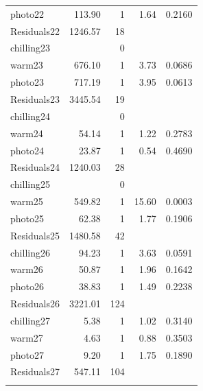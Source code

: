 \documentclass{article}\usepackage[]{graphicx}\usepackage[]{color}
\begin{document}
\begin{table}[ht]
\begin{tabular}{lrrrr}
  photo22 & 113.90 & 1 & 1.64 & 0.2160 \\ 
  Residuals22 & 1246.57 & 18 &  &  \\ 
   \hline
chilling23 &  & 0 &  &  \\ 
  warm23 & 676.10 & 1 & 3.73 & 0.0686 \\ 
  photo23 & 717.19 & 1 & 3.95 & 0.0613 \\ 
  Residuals23 & 3445.54 & 19 &  &  \\ 
   \hline
chilling24 &  & 0 &  &  \\ 
  warm24 & 54.14 & 1 & 1.22 & 0.2783 \\ 
  photo24 & 23.87 & 1 & 0.54 & 0.4690 \\ 
  Residuals24 & 1240.03 & 28 &  &  \\ 
   \hline
chilling25 &  & 0 &  &  \\ 
  warm25 & 549.82 & 1 & 15.60 & 0.0003 \\ 
  photo25 & 62.38 & 1 & 1.77 & 0.1906 \\ 
  Residuals25 & 1480.58 & 42 &  &  \\ 
   \hline
chilling26 & 94.23 & 1 & 3.63 & 0.0591 \\ 
  warm26 & 50.87 & 1 & 1.96 & 0.1642 \\ 
  photo26 & 38.83 & 1 & 1.49 & 0.2238 \\ 
  Residuals26 & 3221.01 & 124 &  &  \\ 
   \hline
chilling27 & 5.38 & 1 & 1.02 & 0.3140 \\ 
  warm27 & 4.63 & 1 & 0.88 & 0.3503 \\ 
  photo27 & 9.20 & 1 & 1.75 & 0.1890 \\ 
  Residuals27 & 547.11 & 104 &  &  \\ 
   \hline
\multicolumn{4}{l}{}\\
\end{tabular}
\end{table}
\end{document}
